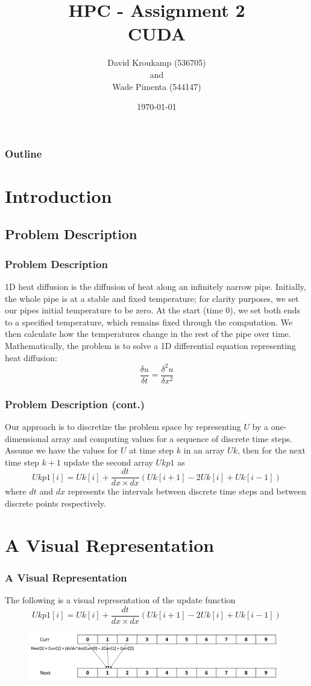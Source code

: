 \documentclass{beamer}
\author{David Kroukamp (536705)\\and\\Wade Pimenta (544147)}
\title{HPC - Assignment 2\\CUDA}
\institute{University of the Witwatersrand, Johannesburg,
South Africa}
\date{\today}
\begin{document}
\begin{frame}
	\maketitle
\end{frame}

\begin{frame}
	\frametitle{Outline}
	\tableofcontents
\end{frame}

\section{Introduction}
\subsection{Problem Description}
\begin{frame}
	\frametitle{Problem Description}
	1D heat diffusion is the diffusion of heat along an infinitely narrow pipe. Initially, the whole pipe is at a stable and fixed temperature; for clarity purposes, we set our pipes initial temperature to be zero. At the start (time 0), we set both ends to a specified temperature, which remains fixed through the computation. We then calculate how the temperatures change in the rest of the pipe over time. Mathematically, the problem is to solve a 1D differential equation representing heat diffusion:
	$$\frac{\delta u}{\delta t} = \frac{\delta^{2}u}{\delta x^{2}}$$
\end{frame}
\begin{frame}
	\frametitle{Problem Description (cont.)}
	Our approach is to discretize the problem space by representing $U$ by a one-dimensional array and computing values for a sequence of discrete time steps. Assume we have the values for $U$ at time step $k$ in an array $Uk$, then for the next time step $k + 1$ update the second array $Ukp1$ as
	$$Ukp1[i] = Uk[i] + \frac{dt}{dx \times dx}(Uk[i+1] - 2Uk[i] + Uk[i-1])$$ where $dt$ and $dx$ represents the intervals between discrete time steps and between discrete points respectively.
\end{frame}

\section{A Visual Representation}
\begin{frame}
	\frametitle{A Visual Representation}
	The following is a visual representation of the update function $$Ukp1[i] = Uk[i] + \frac{dt}{dx \times dx}(Uk[i+1] - 2Uk[i] + Uk[i-1])$$
	\begin{figure}
		\includegraphics[width=11cm]{Visual1.jpg}
	\end{figure}
\end{frame}
\end{document}
